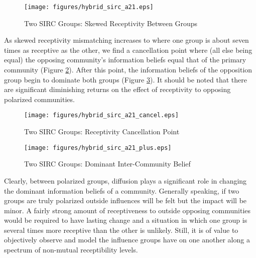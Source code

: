 \begin{figure}[!htbp] \centering
  \texttt{[image: figures/hybrid\_sirc\_a21.eps]}
  \caption{Two SIRC Groups: Skewed Receptivity Between Groups}
  \label{fig:hybrid_sirc_a21}
\end{figure}

As skewed receptivity mismatching increases to where one group is about seven times as receptive as the other, we find a cancellation point where (all else being equal) the opposing community's information beliefs equal that of the primary community (Figure \ref{fig:hybrid_sirc_a21_cancel}). After this point, the information beliefs of the opposition group begin to dominate both groups (Figure \ref{fig:hybrid_sirc_a21_plus}). It should be noted that there are significant diminishing returns on the effect of receptivity to opposing polarized communities. 

\begin{figure}[!htbp] \centering
  \texttt{[image: figures/hybrid\_sirc\_a21\_cancel.eps]}
  \caption{Two SIRC Groups: Receptivity Cancellation Point}
  \label{fig:hybrid_sirc_a21_cancel}
\end{figure}

\begin{figure}[!htbp] \centering
  \texttt{[image: figures/hybrid\_sirc\_a21\_plus.eps]}
  \caption{Two SIRC Groups: Dominant Inter-Community Belief}
  \label{fig:hybrid_sirc_a21_plus}
\end{figure}

Clearly, between polarized groups, diffusion plays a significant role in changing the dominant information beliefs of a community. Generally speaking, if two groups are truly polarized outside influences will be felt but the impact will be minor. A fairly strong amount of receptiveness to outside opposing communities would be required to have lasting change and a situation in which one group is several times more receptive than the other is unlikely. Still, it is of value to objectively observe and model the influence groups have on one another along a spectrum of non-mutual receptibility levels.